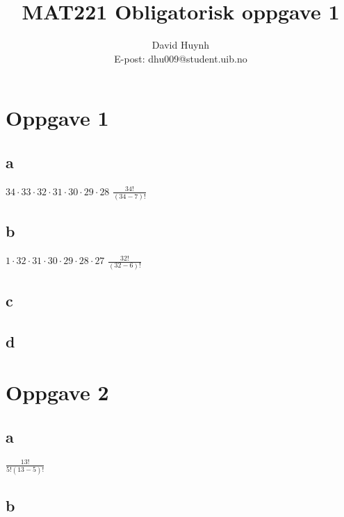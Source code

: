 \documentclass{article}
\begin{document}
\title{MAT221 Obligatorisk oppgave 1}
\author{David Huynh\\E-post: dhu009@student.uib.no}
\maketitle

\section*{Oppgave 1}

\subsection*{a}

$34 \cdotp 33 \cdotp 32 \cdotp 31 \cdotp 30 \cdotp 29 \cdotp 28$
$\frac{34!}{(34-7)!}$

\subsection*{b}

$1 \cdotp 32 \cdotp 31 \cdotp 30 \cdotp 29 \cdotp 28 \cdotp 27$
$\frac{32!}{(32-6)!}$

\subsection*{c}

\subsection*{d}

\section*{Oppgave 2}

\subsection*{a}
$\frac{13!}{5!(13-5)!}$

\subsection*{b}
\end{document}
